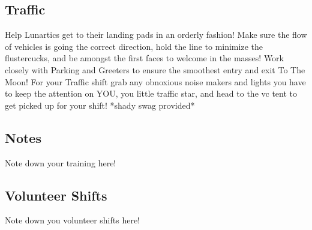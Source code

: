 \subsection*{Traffic}

Help Lunartics get to their landing pads in an orderly fashion! Make sure the flow of vehicles is going the correct direction, hold the line to minimize the flustercucks, and be amongst the first faces to welcome in the masses! Work closely with Parking and Greeters to ensure the smoothest entry and exit To The Moon! For your Traffic shift grab any obnoxious noise makers and lights you have to keep the attention on YOU, you little traffic star, and head to the \gls{vc} tent to get picked up for your shift! *shady swag provided*




\newpage
\subsection*{Notes}

Note down your training here!


\vspace{2.5in}

\subsection*{Volunteer Shifts}

Note down you volunteer shifts here!